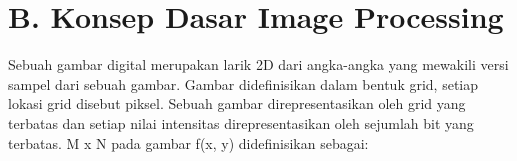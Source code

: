 \documentclass[
  letterpaper,
  DIV=11,
  numbers=noendperiod]{scrreprt}
\begin{document}
\hypertarget{b.-konsep-dasar-image-processing}{%
\section*{B. Konsep Dasar Image
Processing}\label{b.-konsep-dasar-image-processing}}


Sebuah gambar digital merupakan larik 2D dari angka-angka yang mewakili
versi sampel dari sebuah gambar. Gambar didefinisikan dalam bentuk grid,
setiap lokasi grid disebut piksel. Sebuah gambar direpresentasikan oleh
grid yang terbatas dan setiap nilai intensitas direpresentasikan oleh
sejumlah bit yang terbatas. M x N pada gambar f(x, y) didefinisikan
sebagai:
\end{document}
